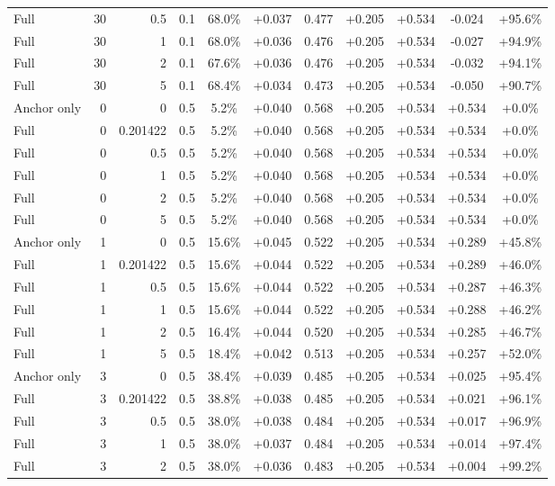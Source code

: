 \begin{table}[htbp]
\begin{tabular}{lrrrccccccc}
Full & 30 & 0.5 & 0.1 & 68.0\% & +0.037 & 0.477 & +0.205 & +0.534 & -0.024 & +95.6\% \\
Full & 30 & 1 & 0.1 & 68.0\% & +0.036 & 0.476 & +0.205 & +0.534 & -0.027 & +94.9\% \\
Full & 30 & 2 & 0.1 & 67.6\% & +0.036 & 0.476 & +0.205 & +0.534 & -0.032 & +94.1\% \\
Full & 30 & 5 & 0.1 & 68.4\% & +0.034 & 0.473 & +0.205 & +0.534 & -0.050 & +90.7\% \\
Anchor only & 0 & 0 & 0.5 & 5.2\% & +0.040 & 0.568 & +0.205 & +0.534 & +0.534 & +0.0\% \\
Full & 0 & 0.201422 & 0.5 & 5.2\% & +0.040 & 0.568 & +0.205 & +0.534 & +0.534 & +0.0\% \\
Full & 0 & 0.5 & 0.5 & 5.2\% & +0.040 & 0.568 & +0.205 & +0.534 & +0.534 & +0.0\% \\
Full & 0 & 1 & 0.5 & 5.2\% & +0.040 & 0.568 & +0.205 & +0.534 & +0.534 & +0.0\% \\
Full & 0 & 2 & 0.5 & 5.2\% & +0.040 & 0.568 & +0.205 & +0.534 & +0.534 & +0.0\% \\
Full & 0 & 5 & 0.5 & 5.2\% & +0.040 & 0.568 & +0.205 & +0.534 & +0.534 & +0.0\% \\
Anchor only & 1 & 0 & 0.5 & 15.6\% & +0.045 & 0.522 & +0.205 & +0.534 & +0.289 & +45.8\% \\
Full & 1 & 0.201422 & 0.5 & 15.6\% & +0.044 & 0.522 & +0.205 & +0.534 & +0.289 & +46.0\% \\
Full & 1 & 0.5 & 0.5 & 15.6\% & +0.044 & 0.522 & +0.205 & +0.534 & +0.287 & +46.3\% \\
Full & 1 & 1 & 0.5 & 15.6\% & +0.044 & 0.522 & +0.205 & +0.534 & +0.288 & +46.2\% \\
Full & 1 & 2 & 0.5 & 16.4\% & +0.044 & 0.520 & +0.205 & +0.534 & +0.285 & +46.7\% \\
Full & 1 & 5 & 0.5 & 18.4\% & +0.042 & 0.513 & +0.205 & +0.534 & +0.257 & +52.0\% \\
Anchor only & 3 & 0 & 0.5 & 38.4\% & +0.039 & 0.485 & +0.205 & +0.534 & +0.025 & +95.4\% \\
Full & 3 & 0.201422 & 0.5 & 38.8\% & +0.038 & 0.485 & +0.205 & +0.534 & +0.021 & +96.1\% \\
Full & 3 & 0.5 & 0.5 & 38.0\% & +0.038 & 0.484 & +0.205 & +0.534 & +0.017 & +96.9\% \\
Full & 3 & 1 & 0.5 & 38.0\% & +0.037 & 0.484 & +0.205 & +0.534 & +0.014 & +97.4\% \\
Full & 3 & 2 & 0.5 & 38.0\% & +0.036 & 0.483 & +0.205 & +0.534 & +0.004 & +99.2\% \\

\end{tabular}
\end{table}
